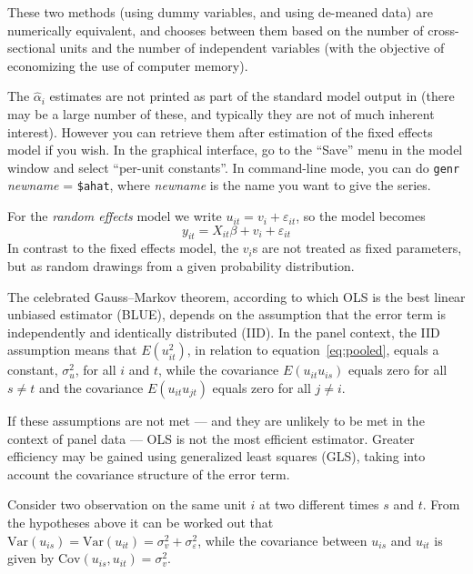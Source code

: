 These two methods (using dummy variables, and using de-meaned data) are
numerically equivalent, and  chooses between them based on
the number of cross-sectional units and the number of independent
variables (with the objective of economizing the use of computer memory).

The $\hat{\alpha}_i$ estimates are not printed as part of the standard
model output in  (there may be a large number of these, and
typically they are not of much inherent interest).  However you can
retrieve them after estimation of the fixed effects model if you
wish.  In the graphical interface, go to the ``Save'' menu in the
model window and select ``per-unit constants''.  In command-line mode,
you can do \texttt{genr} \textsl{newname} = \verb+$ahat+, where
\textsl{newname} is the name you want to give the series. 

For the \textsl{random effects} model we write $u_{it} = v_i +
\varepsilon_{it}$, so the model becomes
\begin{equation}
\label{eq:RE}
y_{it} = X_{it}\beta + v_i + \varepsilon_{it}
\end{equation}
In contrast to the fixed effects model, the $v_i$s are not treated as
fixed parameters, but as random drawings from a given probability
distribution.

The celebrated Gauss--Markov theorem, according to which OLS is the
best linear unbiased estimator (BLUE), depends on the assumption that
the error term is independently and identically distributed (IID).  In
the panel context, the IID assumption means that $E(u_{it}^2)$, in
relation to equation~\ref{eq:pooled}, equals a constant, $\sigma^2_u$,
for all $i$ and $t$, while the covariance $E(u_{it} u_{is})$ equals
zero for all $s \neq t$ and the covariance $E(u_{it} u_{jt})$ equals
zero for all $j \neq i$.

If these assumptions are not met --- and they are unlikely to be met
in the context of panel data --- OLS is not the most efficient
estimator.  Greater efficiency may be gained using generalized least
squares (GLS), taking into account the covariance structure of the
error term.  

Consider two observation on the same unit $i$ at two different times
$s$ and $t$. From the hypotheses above it can be worked out that
$\mbox{Var}(u_{is}) = \mbox{Var}(u_{it}) = \sigma^2_{v} +
\sigma^2_{\varepsilon}$, while the covariance between $u_{is}$ and
$u_{it}$ is given by $\mbox{Cov}(u_{is},u_{it}) = \sigma^2_{v}$.

